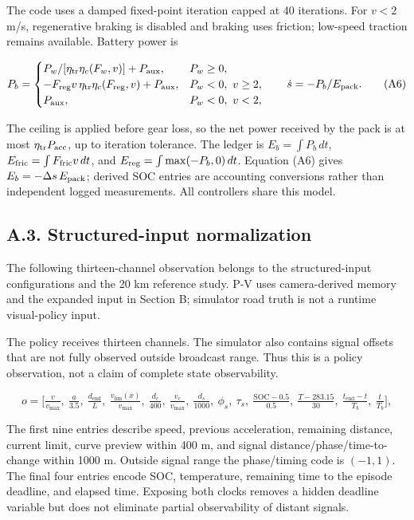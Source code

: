 \documentclass[letterpaper,journal,onecolumn]{IEEEtran}
\begin{document}
The code uses a damped fixed-point iteration capped at 40 iterations. For \(v<2\) m/s, regenerative braking is disabled and braking uses friction; low-speed traction remains available. Battery power is

\[P_b=\begin{cases}
P_w/[\eta_{\rm tr}\eta_c(F_w,v)]+P_{\rm aux},&P_w\ge0,\\
-F_{\rm reg}v\,\eta_{\rm tr}\eta_c(F_{\rm reg},v)+P_{\rm aux},&P_w<0,\ v\ge2,\\
P_{\rm aux},&P_w<0,\ v<2,
\end{cases}
\qquad \dot s=-P_b/E_{\rm pack}. \tag{A6}\]

The ceiling is applied before gear loss, so the net power received by the pack is at most \(\eta_{\rm tr}P_{\rm acc}\), up to iteration tolerance. The ledger is \(E_b=\int P_b\,dt\), \(E_{\rm fric}=\int F_{\rm fric}v\,dt\), and \(E_{\rm reg}=\int\max(-P_b,0)\,dt\). Equation (A6) gives \(E_b=-\Delta s\,E_{\rm pack}\); derived SOC entries are accounting conversions rather than independent logged measurements. All controllers share this model.

\subsection*{A.3. Structured-input normalization}

The following thirteen-channel observation belongs to the structured-input configurations and the 20 km reference study. P-V uses camera-derived memory and the expanded input in Section B; simulator road truth is not a runtime visual-policy input.

The policy receives thirteen channels. The simulator also contains signal offsets that are not fully observed outside broadcast range. Thus this is a policy observation, not a claim of complete state observability.

\[o = \Big[\tfrac{v}{v_{\max}},\ \tfrac{a}{3.5},\ \tfrac{d_{\text{end}}}{L},\ \tfrac{v_{\lim}(x)}{v_{\max}},\ \tfrac{d_c}{400},\ \tfrac{v_c}{v_{\max}},\ \tfrac{d_s}{1000},\ \phi_s,\ \tau_s,\ \tfrac{\text{SOC}-0.5}{0.5},\ \tfrac{T-283.15}{30},\ \tfrac{t_{\text{end}} - t}{T_b},\ \tfrac{t}{T_b}\Big], \tag{A7}\]

The first nine entries describe speed, previous acceleration, remaining distance, current limit, curve preview within 400 m, and signal distance/phase/time-to-change within 1000 m. Outside signal range the phase/timing code is \((-1,1)\). The final four entries encode SOC, temperature, remaining time to the episode deadline, and elapsed time. Exposing both clocks removes a hidden deadline variable but does not eliminate partial observability of distant signals.
\end{document}
